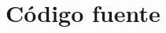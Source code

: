 \documentclass[\main/main.tex]{subfiles}
\begin{document}
\chapter{Código fuente}
\label{cha:a01_código_fuente}
\end{document}
